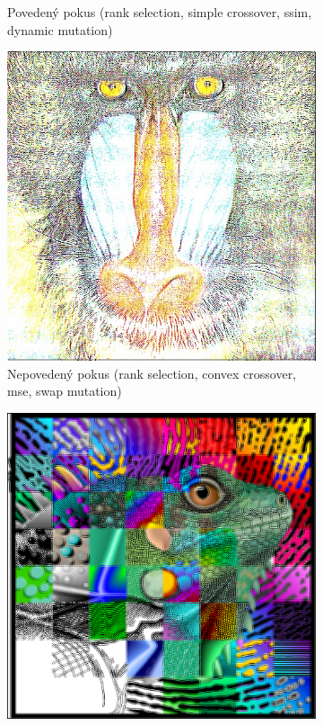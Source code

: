 \documentclass[a4paper,11pt]{scrartcl}
\begin{document}
\begin{figure}[!h]
\begin{subfigure}[b]{0.4\textwidth}
        \caption{Povedený pokus (rank selection, simple crossover, ssim, dynamic mutation)}
        \label{fig:gull}
    \end{subfigure}
        \begin{subfigure}[b]{0.4\textwidth}
        \includegraphics[width=\textwidth]{img/ranksel-convex-mse-swap_example1.jpg}
        \caption{Nepovedený pokus (rank selection, convex crossover, mse, swap mutation)}
        \label{fig:gull}
    \end{subfigure}
        \begin{subfigure}[b]{0.4\textwidth}
        \includegraphics[width=\textwidth]{img/example2_E.png}

\end{subfigure}
\end{figure}
\end{document}
